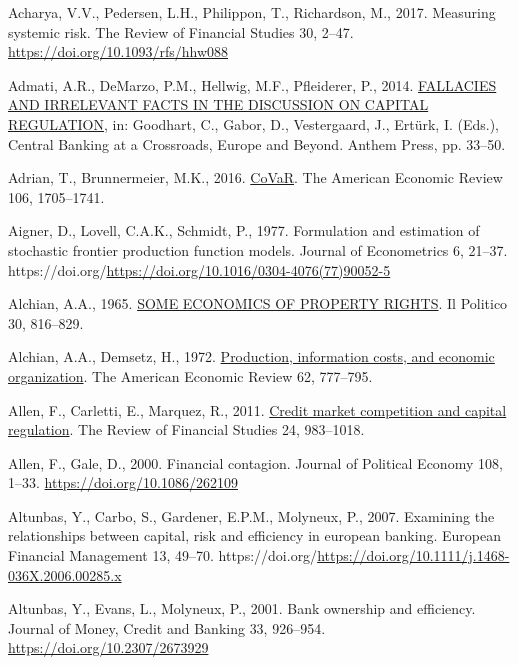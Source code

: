 \documentclass[
  12pt,
  a4paper,
]{scrreprt}
\newlength{\cslhangindent}
\newenvironment{CSLReferences}[2] %
 {\begin{list}{}{%
  \setlength{\itemindent}{0pt}
  \setlength{\leftmargin}{0pt}
  \setlength{\parsep}{0pt}
  \ifodd #1
   \setlength{\leftmargin}{\cslhangindent}
   \setlength{\itemindent}{-1\cslhangindent}
  \fi
  \setlength{\itemsep}{#2\baselineskip}}}
 {\end{list}}
\begin{document}
{{{{\begin{CSLReferences}{1}{0}
Acharya, V.V., Pedersen, L.H., Philippon, T., Richardson, M., 2017.
Measuring systemic risk. The Review of Financial Studies 30, 2--47.
\url{https://doi.org/10.1093/rfs/hhw088}

Admati, A.R., DeMarzo, P.M., Hellwig, M.F., Pfleiderer, P., 2014.
\href{http://www.jstor.org/stable/j.ctt1gxpd6m.6}{FALLACIES AND
IRRELEVANT FACTS IN THE DISCUSSION ON CAPITAL REGULATION}, in: Goodhart,
C., Gabor, D., Vestergaard, J., Ertürk, I. (Eds.), Central Banking at a
Crossroads, Europe and Beyond. Anthem Press, pp. 33--50.

Adrian, T., Brunnermeier, M.K., 2016.
\href{http://www.jstor.org/stable/43861110}{CoVaR}. The American
Economic Review 106, 1705--1741.

Aigner, D., Lovell, C.A.K., Schmidt, P., 1977. Formulation and
estimation of stochastic frontier production function models. Journal of
Econometrics 6, 21--37.
https://doi.org/\url{https://doi.org/10.1016/0304-4076(77)90052-5}

Alchian, A.A., 1965. \href{http://www.jstor.org/stable/43206327}{SOME
ECONOMICS OF PROPERTY RIGHTS}. Il Politico 30, 816--829.

Alchian, A.A., Demsetz, H., 1972.
\href{http://www.jstor.org/stable/1815199}{Production, information
costs, and economic organization}. The American Economic Review 62,
777--795.

Allen, F., Carletti, E., Marquez, R., 2011.
\href{http://www.jstor.org.queens.ezp1.qub.ac.uk/stable/20869263}{Credit
market competition and capital regulation}. The Review of Financial
Studies 24, 983--1018.

Allen, F., Gale, D., 2000. Financial contagion. Journal of Political
Economy 108, 1--33. \url{https://doi.org/10.1086/262109}

Altunbas, Y., Carbo, S., Gardener, E.P.M., Molyneux, P., 2007. Examining
the relationships between capital, risk and efficiency in european
banking. European Financial Management 13, 49--70.
https://doi.org/\url{https://doi.org/10.1111/j.1468-036X.2006.00285.x}

Altunbas, Y., Evans, L., Molyneux, P., 2001. Bank ownership and
efficiency. Journal of Money, Credit and Banking 33, 926--954.
\url{https://doi.org/10.2307/2673929}


\end{CSLReferences}}}}}
\end{document}
